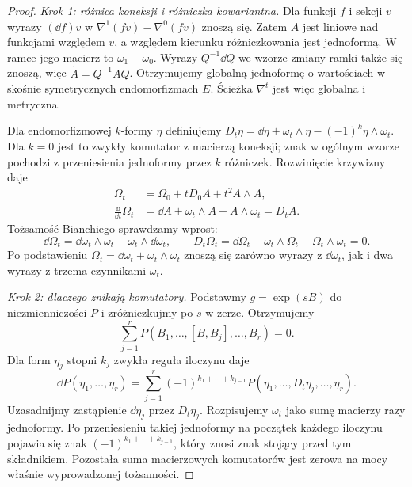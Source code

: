 \begin{proof}
\emph{Krok 1: różnica koneksji i różniczka kowariantna.}
Dla funkcji $f$ i sekcji $v$ wyrazy $(\dd f)v$ w
$\nabla^1(fv)-\nabla^0(fv)$ znoszą się.
Zatem $A$ jest liniowe nad funkcjami względem $v$,
a względem kierunku różniczkowania jest jednoformą.
W ramce jego macierz to $\omega_1-\omega_0$.
Wyrazy $Q^{-1}\dd Q$ we wzorze zmiany ramki także się znoszą,
więc $\widetilde A=Q^{-1}AQ$.
Otrzymujemy globalną jednoformę o wartościach
w skośnie symetrycznych endomorfizmach $E$.
Ścieżka $\nabla^t$ jest więc globalna i metryczna.

Dla endomorfizmowej $k$-formy $\eta$ definiujemy
$D_t\eta=\dd\eta+\omega_t\wedge\eta-(-1)^k\eta\wedge\omega_t$.
Dla $k=0$ jest to zwykły komutator z macierzą koneksji;
znak w ogólnym wzorze pochodzi z przeniesienia jednoformy
przez $k$ różniczek. Rozwinięcie krzywizny daje
\begin{align*}
 \Omega_t&=\Omega_0+tD_0A+t^2A\wedge A,\\
 \frac{\dd}{\dd t}\Omega_t
 &=\dd A+\omega_t\wedge A+A\wedge\omega_t=D_tA.
\end{align*}
Tożsamość Bianchiego sprawdzamy wprost:
\[
 \dd\Omega_t
 =\dd\omega_t\wedge\omega_t-\omega_t\wedge\dd\omega_t,
 \qquad
 D_t\Omega_t
 =\dd\Omega_t+\omega_t\wedge\Omega_t-\Omega_t\wedge\omega_t=0.
\]
Po podstawieniu $\Omega_t=\dd\omega_t+\omega_t\wedge\omega_t$
znoszą się zarówno wyrazy z $\dd\omega_t$,
jak i dwa wyrazy z trzema czynnikami $\omega_t$.

\emph{Krok 2: dlaczego znikają komutatory.}
Podstawmy $g=\exp(sB)$ do niezmienniczości $P$
i zróżniczkujmy po $s$ w zerze. Otrzymujemy
\[
 \sum_{j=1}^r
 P(B_1,\ldots,[B,B_j],\ldots,B_r)=0.
\]
Dla form $\eta_j$ stopni $k_j$ zwykła reguła iloczynu daje
\[
 \dd P(\eta_1,\ldots,\eta_r)
 =\sum_{j=1}^r(-1)^{k_1+\cdots+k_{j-1}}
 P(\eta_1,\ldots,D_t\eta_j,\ldots,\eta_r).
\]
Uzasadnijmy zastąpienie $\dd\eta_j$ przez $D_t\eta_j$.
Rozpisujemy $\omega_t$ jako sumę macierzy razy jednoformy.
Po przeniesieniu takiej jednoformy na początek każdego
iloczynu pojawia się znak $(-1)^{k_1+\cdots+k_{j-1}}$,
który znosi znak stojący przed tym składnikiem.
Pozostała suma macierzowych komutatorów jest zerowa
na mocy właśnie wyprowadzonej tożsamości.


\end{proof}
